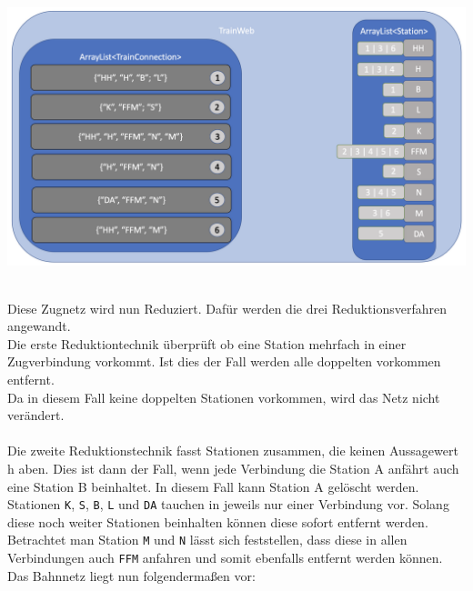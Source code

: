 \begin{center}
    \includegraphics[width=\linewidth]{images/Programmdurchlauf/Datenstruktur01.png}
    \label{test:subsecpar:datenstruktur1}
\end{center}
\\
Diese Zugnetz wird nun Reduziert. Dafür werden die drei Reduktionsverfahren angewandt.\\
Die erste Reduktiontechnik überprüft ob eine Station mehrfach in einer Zugverbindung vorkommt. Ist dies der Fall werden alle doppelten vorkommen entfernt.\\
Da in diesem Fall keine doppelten Stationen vorkommen, wird das Netz nicht verändert.\\
\\
Die zweite Reduktionstechnik fasst Stationen zusammen, die keinen Aussagewert h aben. Dies ist dann der Fall, wenn jede Verbindung die Station A anfährt auch eine Station B beinhaltet. In diesem Fall kann Station A gelöscht werden.\\
Stationen \texttt{K}, \texttt{S}, \texttt{B}, \texttt{L} und \texttt{DA} tauchen in jeweils nur einer Verbindung vor. Solang diese noch weiter Stationen beinhalten können diese sofort entfernt werden. Betrachtet man Station \texttt{M} und \texttt{N} lässt sich feststellen, dass diese in allen Verbindungen auch \texttt{FFM} anfahren und somit ebenfalls entfernt werden können.\\
Das Bahnnetz liegt nun folgendermaßen vor:\\

